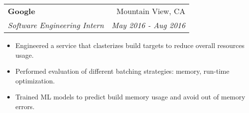 \documentclass[letterpaper,11pt]{article}
\makeatletter
\newcommand{\resumeItem}[1]{
  \item\small{
    {#1 \vspace{-2pt}}
  }
}
\newcommand{\resumeSubheading}[4]{
  \vspace{-0pt}\item
    \begin{tabular*}{0.97\textwidth}{l@{\extracolsep{\fill}}r}
      \textbf{#1} & #2 \\
      \textit{\small#3} & \textit{\small #4} \\
    \end{tabular*}\vspace{-2pt}
}
\newcommand{\resumeItemListStart}{\begin{itemize}}
\newcommand{\resumeItemListEnd}{\end{itemize}\vspace{-0pt}}
\makeatother
\begin{document}
    \resumeSubheading
      {Google}{Mountain View, CA}
      {Software Engineering Intern}{May 2016 - Aug 2016}
      \resumeItemListStart
        \resumeItem{Engineered a service that clasterizes build targets to reduce overall resources usage.}
        \resumeItem{Performed evaluation of different batching strategies: memory, run-time optimization.}
        \resumeItem{Trained ML models to predict build memory usage and avoid out of memory errors.}
      \resumeItemListEnd

\end{document}
